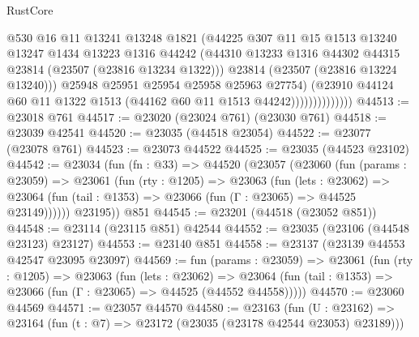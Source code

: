 \begin{lexlean}{RustCore}
\begin{coremodule}
                              @530
                              @16
                              @11
                              @13241
                              @13248
                              @1821
                              (@44225
                                @307
                                @11
                                @15
                                @1513
                                @13240
                                @13247
                                @1434
                                @13223
                                @1316
                                @44242
                                (@44310
                                  @13233
                                  @1316
                                  @44302
                                  @44315
                                  @23814
                                  (@23507 (@23816 @13234 @1322)))
                                @23814
                                (@23507 (@23816 @13224 @13240)))
                              @25948
                              @25951
                              @25954
                              @25958
                              @25963
                              @27754)
                            (@23910
                              @44124
                              @60
                              @11
                              @1322
                              @1513
                              (@44162 @60 @11 @1513 @44242))))))))))))))
@44513 := @23018 @761
@44517 := @23020 (@23024 @761) (@23030 @761)
@44518 := @23039 @42541
@44520 := @23035 (@44518 @23054)
@44522 := @23077 (@23078 @761)
@44523 := @23073 @44522
@44525 := @23035 (@44523 @23102)
@44542 := @23034
    (fun (fn : @33) =>
    @44520
      (@23057
        (@23060
          (fun (params : @23059) =>
          @23061
            (fun (rty : @1205) =>
            @23063
              (fun (lets : @23062) =>
              @23064 (fun (tail : @1353) => @23066 (fun (Γ : @23065) => @44525 @23149))))))
        @23195))
    @851
@44545 := @23201 (@44518 (@23052 @851))
@44548 := @23114 (@23115 @851) @42544
@44552 := @23035 (@23106 (@44548 @23123) @23127)
@44553 := @23140 @851
@44558 := @23137 (@23139 @44553 @42547 @23095 @23097)
@44569 := fun (params : @23059) =>
  @23061
    (fun (rty : @1205) =>
    @23063
      (fun (lets : @23062) =>
      @23064 (fun (tail : @1353) => @23066 (fun (Γ : @23065) => @44525 (@44552 @44558)))))
@44570 := @23060 @44569
@44571 := @23057 @44570
@44580 := @23163
    (fun (U : @23162) => @23164 (fun (t : @7) => @23172 (@23035 (@23178 @42544 @23053) @23189)))

\end{coremodule}
\end{lexlean}
